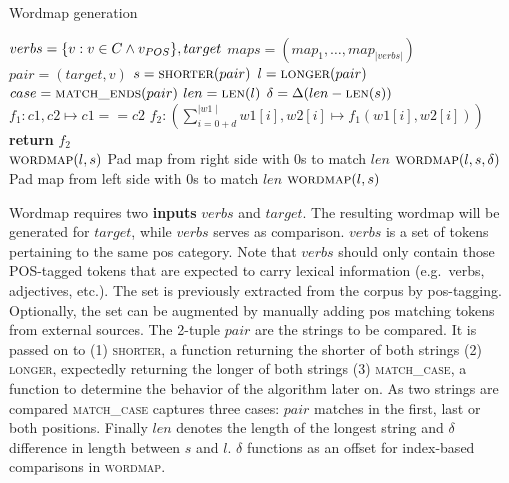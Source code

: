 \algrenewcommand{}
\algrenewcommand{}
\begin{algorithm}
    \caption{Wordmap generation}\label{alg:wordmap}
    \begin{algorithmic}[1]
        \Require $verbs = \{v : v \in C \wedge v_{\uppercase{POS}}\}, target$ 
        \Ensure $maps = (map_{1}, \ldots, map_{|verbs|})$
        \State $pair = (target, v)$
        \State $s = \textsc{shorter}(pair)$
        \State $l = \textsc{longer}(pair)$
        \State $case = \textsc{match\_ends}(pair)$ 
        \State $len = \textsc{len}(l)$
        \State $\delta = \Delta(len - \textsc{len}(s))$
        \\

            \State $f_{1}: c1, c2 \mapsto c1 == c2$
            \State $f_{2}: \left(\sum_{i=0+d}^{\mid w1 \mid} w1[i], w2[i] \mapsto f_{1}(w1[i], w2[i])\right)$
            \State \textbf{return} $f_{2}$
        \EndFunction
        \\
            \If{$\delta$}
                        \State $\textsc{wordmap}(l, s)$
                    \State Pad map from right side with 0s to match $len$
                \EndIf
                        \State $\textsc{wordmap}(l, s, \delta)$
                    \State Pad map from left side with 0s to match $len$
                \EndIf
            \Else
                \State $\textsc{wordmap}(l, s)$
            \EndIf
        \EndIf

    \end{algorithmic}
\end{algorithm}


Wordmap requires two \textbf{inputs} $verbs$ and $target$.
The resulting wordmap will be generated for $target$, while $verbs$ serves as comparison.
$verbs$ is a set of tokens pertaining to the same \ac{pos} category.
Note that $verbs$ should only contain those POS-tagged tokens that are expected to carry lexical information (e.g.\ verbs, adjectives, etc.).
The set is previously extracted from the corpus by \ac{pos}\hyphen tagging.
Optionally, the set can be augmented by manually adding \ac{pos} matching tokens from external sources.
The 2-tuple $pair$ are the strings to be compared.
It is passed on to (1) \textsc{shorter}, a function returning the shorter of both strings (2) \textsc{longer}, expectedly returning the longer of both strings (3) \textsc{match\_case}, a function to determine the behavior of the algorithm later on.
As two strings are compared \textsc{match\_case} captures three cases: $pair$ matches in the first, last or both positions.
Finally $len$ denotes the length of the longest string and $\delta$ difference in length between $s$ and $l$.
$\delta$ functions as an offset for index-based comparisons in \textsc{wordmap}.

